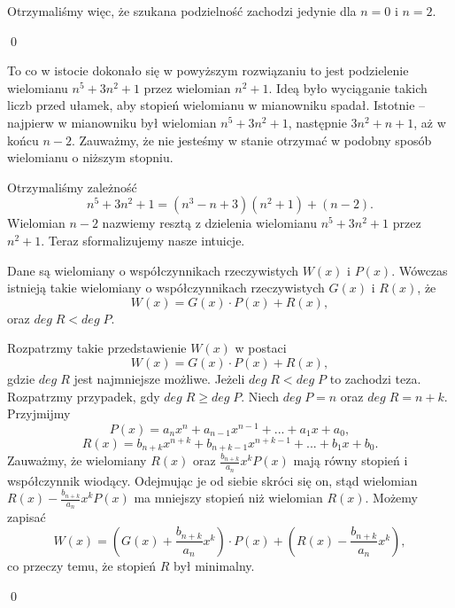 \vspace{5px}

\noindent
Otrzymaliśmy więc, że szukana podzielność zachodzi jedynie dla $n = 0$ i $n = 2$.

\qed

\noindent 
To co w istocie dokonało się w powyższym rozwiązaniu to jest podzielenie wielomianu $n^5 + 3n^2 + 1$ przez wielomian $n^2 + 1$. Ideą było wyciąganie takich liczb przed ułamek, aby stopień wielomianu w mianowniku spadał. Istotnie -- najpierw w mianowniku był wielomian $n^5 + 3n^2 + 1$, następnie $3n^2 + n + 1$, aż w końcu $n - 2$. Zauważmy, że nie jesteśmy w stanie otrzymać w podobny sposób wielomianu o niższym stopniu.

\vspace{5px}
\noindent
Otrzymaliśmy zależność
\[
    n^5 + 3n^2 + 1 = (n^3 - n + 3)(n^2 + 1) + (n - 2).
\]
Wielomian $n - 2$ nazwiemy resztą z dzielenia wielomianu $n^5 + 3n^2 + 1$ przez $n^2 + 1$. Teraz sformalizujemy nasze intuicje.

\vspace{5px}


\noindent
Dane są wielomiany o współczynnikach rzeczywistych $W(x)$ i $P(x)$. Wówczas istnieją takie wielomiany o współczynnikach rzeczywistych $G(x)$ i $R(x)$, że
\[
    W(x) = G(x) \cdot P(x) + R(x),
\]
oraz $deg \; R < deg\; P$. 

\vspace{10px}


\noindent
Rozpatrzmy takie przedstawienie $W(x)$ w postaci
\[
    W(x) = G(x) \cdot P(x) + R(x),
\]
gdzie $deg \; R$ jest najmniejsze możliwe. Jeżeli $deg \; R < deg\; P$ to zachodzi teza. Rozpatrzmy przypadek, gdy $deg \; R \geqslant deg\; P$. Niech $deg \; P = n$ oraz $deg \; R = n + k$. Przyjmijmy
\[
    P(x) =  a_nx^n + a_{n - 1}x^{n - 1} + ... + a_1x + a_0,
\]
\[  
    R(x) = b_{n + k}x^{n + k} + b_{n + k - 1}x^{n + k - 1} + ... + b_1x + b_0.
\]
Zauważmy, że wielomiany $R(x)$ oraz $\frac{b_{n + k}}{a_n}x^kP(x)$ mają równy stopień i współczynnik wiodący. Odejmując je od siebie skróci się on, stąd wielomian $R(x) - \frac{b_{n + k}}{a_n}x^kP(x)$ ma mniejszy stopień niż wielomian $R(x)$. Możemy zapisać
\[
    W(x) = \left(G(x) + \frac{b_{n + k}}{a_n}x^k\right) \cdot  P(x) + \left(R(x) - \frac{b_{n + k}}{a_n}x^k\right),
\]
co przeczy temu, że stopień $R$ był minimalny.

\qed


